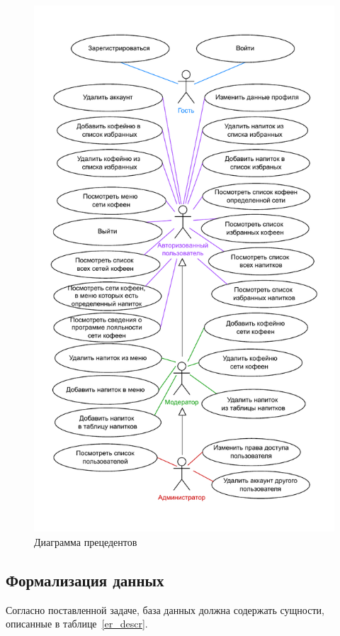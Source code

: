 \begin{figure}[H]
	\centering
	\includegraphics[width=0.8\linewidth]{img/usecase2605.pdf}
	\caption{Диаграмма прецедентов}
	\label{usecase_all}
\end{figure}
\newpage



\subsection{Формализация данных}
Согласно поставленной задаче, база данных должна содержать сущности, описанные в таблице~\ref{er_descr}.

